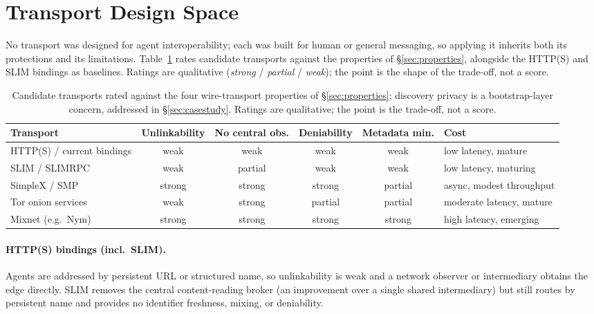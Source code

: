 \documentclass[10pt,twocolumn]{article}
\theoremstyle{definition}
\begin{document}
\section{Transport Design Space}\label{sec:transports}
No transport was designed for agent interoperability; each was built for human or
general messaging, so applying it inherits both its protections and its
limitations. Table~\ref{tab:transports} rates candidate transports against the
properties of \S\ref{sec:properties}, alongside the HTTP(S) and SLIM bindings as
baselines. Ratings are qualitative (\emph{strong} / \emph{partial} /
\emph{weak}); the point is the shape of the trade-off, not a score.

\begin{table}[t]
\centering\footnotesize
\begin{tabular}{@{}lccccl@{}}
\toprule
Transport & Unlinkability & No central obs. & Deniability & Metadata min. & Cost \\
\midrule
HTTP(S) / current bindings & weak & weak & weak & weak & low latency, mature \\
SLIM / SLIMRPC & weak & partial & weak & weak & low latency, maturing \\
SimpleX / SMP & strong & strong & strong & partial & async, modest throughput \\
Tor onion services & weak & strong & partial & partial & moderate latency, mature \\
Mixnet (e.g.\ Nym) & strong & strong & strong & strong & high latency, emerging \\
\bottomrule
\end{tabular}
\caption{Candidate transports rated against the four wire-transport properties of
\S\ref{sec:properties}; discovery privacy is a bootstrap-layer concern, addressed in
\S\ref{sec:casestudy}. Ratings are qualitative; the point is the trade-off, not a
score.}
\label{tab:transports}
\end{table}

\paragraph{HTTP(S) bindings (incl.\ SLIM).} Agents are addressed by persistent URL
or structured name, so unlinkability is weak and a network observer or intermediary
obtains the edge directly. SLIM removes the central content-reading broker (an
improvement over a single shared intermediary) but still routes by persistent
name and provides no identifier freshness, mixing, or deniability.
\end{document}
